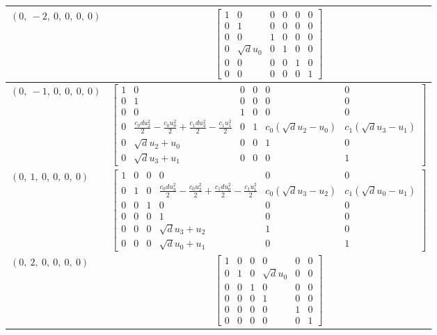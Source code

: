 \documentclass[11pt]{article}
\theoremstyle{definition}
\begin{document}
\begin{longtable}{|l|c|}
    \hline
    $\left( 0, \  -2, \  0, \  0, \  0, \  0\right)$ & ${\left[\begin{matrix}1 & 0 & 0 & 0 & 0 & 0\\0 & 1 & 0 & 0 & 0 & 0\\0 & 0 & 1 & 0 & 0 & 0\\0 & \sqrt{d} u_{0} & 0 & 1 & 0 & 0\\0 & 0 & 0 & 0 & 1 & 0\\0 & 0 & 0 & 0 & 0 & 1\end{matrix}\right]}$ \\
    \hline
    $\left( 0, \  -1, \  0, \  0, \  0, \  0\right)$ & ${\left[\begin{matrix}1 & 0 & 0 & 0 & 0 & 0\\0 & 1 & 0 & 0 & 0 & 0\\0 & 0 & 1 & 0 & 0 & 0\\0 & \frac{c_{0} d u_{2}^{2}}{2} - \frac{c_{0} u_{0}^{2}}{2} + \frac{c_{1} d u_{3}^{2}}{2} - \frac{c_{1} u_{1}^{2}}{2} & 0 & 1 & c_{0} \left(\sqrt{d} u_{2} - u_{0}\right) & c_{1} \left(\sqrt{d} u_{3} - u_{1}\right)\\0 & \sqrt{d} u_{2} + u_{0} & 0 & 0 & 1 & 0\\0 & \sqrt{d} u_{3} + u_{1} & 0 & 0 & 0 & 1\end{matrix}\right]}$ \\
    \hline
    $\left( 0, \  1, \  0, \  0, \  0, \  0\right)$ & ${\left[\begin{matrix}1 & 0 & 0 & 0 & 0 & 0\\0 & 1 & 0 & \frac{c_{0} d u_{3}^{2}}{2} - \frac{c_{0} u_{2}^{2}}{2} + \frac{c_{1} d u_{0}^{2}}{2} - \frac{c_{1} u_{1}^{2}}{2} & c_{0} \left(\sqrt{d} u_{3} - u_{2}\right) & c_{1} \left(\sqrt{d} u_{0} - u_{1}\right)\\0 & 0 & 1 & 0 & 0 & 0\\0 & 0 & 0 & 1 & 0 & 0\\0 & 0 & 0 & \sqrt{d} u_{3} + u_{2} & 1 & 0\\0 & 0 & 0 & \sqrt{d} u_{0} + u_{1} & 0 & 1\end{matrix}\right]}$ \\
    \hline
    $\left( 0, \  2, \  0, \  0, \  0, \  0\right)$ & ${\left[\begin{matrix}1 & 0 & 0 & 0 & 0 & 0\\0 & 1 & 0 & \sqrt{d} u_{0} & 0 & 0\\0 & 0 & 1 & 0 & 0 & 0\\0 & 0 & 0 & 1 & 0 & 0\\0 & 0 & 0 & 0 & 1 & 0\\0 & 0 & 0 & 0 & 0 & 1\end{matrix}\right]}$ \\

\end{longtable}
\end{document}
